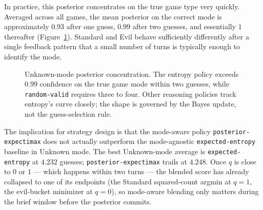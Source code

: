 \documentclass[11pt]{article}
\begin{document}
In practice, this posterior concentrates on the true game type very
quickly. Averaged across all games, the mean posterior on the correct
mode is approximately $0.93$ after one guess, $0.99$ after two
guesses, and essentially $1$ thereafter (Figure~\ref{fig:posterior}).
Standard and Evil behave sufficiently differently after a single
feedback pattern that a small number of turns is typically enough to
identify the mode.

\begin{figure}[h]
\centering
{}
\caption{Unknown-mode posterior concentration. The entropy policy
exceeds $0.99$ confidence on the true game mode within two guesses,
while \texttt{random-valid} requires three to four. Other reasoning
policies track entropy's curve closely; the shape is governed by
the Bayes update, not the guess-selection rule.}
\label{fig:posterior}
\end{figure}

The implication for strategy design is that the mode-aware policy
\texttt{posterior-expectimax} does not actually outperform the
mode-agnostic \texttt{expected-entropy} baseline in Unknown mode.
The best Unknown-mode average is \texttt{expected-entropy} at
$4.232$ guesses; \texttt{posterior-expectimax} trails at $4.248$.
Once $q$ is close to $0$ or $1$ --- which happens within two turns
--- the blended score has already collapsed to one of its
endpoints (the Standard squared-count argmin at $q=1$, the
evil-bucket minimizer at $q=0$), so mode-aware blending only
matters during the brief window before the posterior commits.
\end{document}
